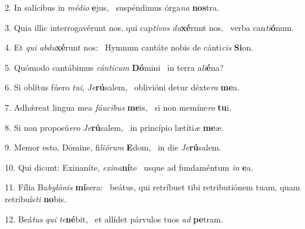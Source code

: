 2. In salícibus in \textit{mé}\textit{di}\textit{o} \textbf{e}jus, \ast\  suspéndimus órga\textit{na} \textbf{nos}tra.\

3. Quia illic interrogavérunt nos, qui cap\textit{tí}\textit{vos} \textit{du}\textbf{xé}runt nos, \ast\  verba can\textit{ti}\textbf{ó}num.\

4. Et \textit{qui} \textit{ab}\textit{du}\textbf{xé}runt nos: \ast\  Hymnum cantáte nobis de cánti\textit{cis} \textbf{Si}on.\

5. Quómodo cantábimus \textit{cán}\textit{ti}\textit{cum} \textbf{Dó}mini \ast\  in terra a\textit{li}\textbf{é}na?\

6. Si oblítus fúero \textit{tu}\textit{i}, \textit{Je}\textbf{rú}salem, \ast\  oblivióni detur déxte\textit{ra} \textbf{me}a.\

7. Adhǽreat lingua mea \textit{fáu}\textit{ci}\textit{bus} \textbf{me}is, \ast\  si non memíne\textit{ro} \textbf{tu}i.\

8. Si non proposú\textit{e}\textit{ro} \textit{Je}\textbf{rú}salem, \ast\  in princípio lætíti\textit{æ} \textbf{me}æ.\

9. Memor esto, Dómine, fi\textit{li}\textit{ó}\textit{rum} \textbf{E}dom, \ast\  in die \textit{Je}\textbf{rú}salem.\

10. Qui dicunt: Exinaníte, \textit{ex}\textit{i}\textit{na}\textbf{ní}te \ast\  usque ad fundaméntum \textit{in} \textbf{e}a.\

11. Fília Ba\textit{by}\textit{ló}\textit{nis} \textbf{mí}sera: \ast\  beátus, qui retríbuet tibi retributiónem tuam, quam retribuís\textit{ti} \textbf{no}bis.\

12. Beá\textit{tus} \textit{qui} \textit{te}\textbf{né}bit, \ast\  et allídet párvulos tuos \textit{ad} \textbf{pe}tram.\

